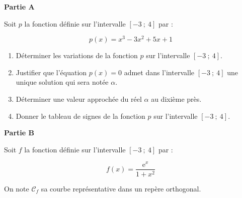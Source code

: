 \documentclass[10pt]{article}
\begin{document}
\bigskip

\textbf{Partie A}

\medskip 

Soit $p$ la fonction définie sur l'intervalle $[-3~;~4]$ par :

\[p(x) = x^3 - 3x^2 + 5x + 1\]

\begin{enumerate}
\item Déterminer les variations de la fonction $p$ sur l'intervalle $[-3~;~4]$.
\item Justifier que l'équation $p(x) = 0$ admet dans l'intervalle $[-3~;~4]$ une unique solution qui sera notée $\alpha$.
\item Déterminer une valeur approchée du réel $\alpha$ au dixième près.
\item Donner le tableau de signes de la fonction $p$ sur l'intervalle $[-3~;~4]$. 
\end{enumerate}

\bigskip

\textbf{Partie B}

\medskip 

Soit $f$ la fonction définie sur l'intervalle $[-3~;~4]$ par :

\[f(x) = \dfrac{\text{e}^x}{1 + x^2}\]

On note $\mathcal{C}_f$ sa courbe représentative dans un repère orthogonal.

\medskip
\end{document}
